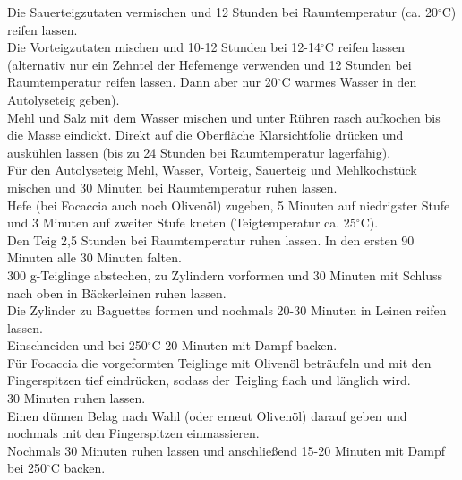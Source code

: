 Die Sauerteigzutaten vermischen und 12 Stunden bei Raumtemperatur (ca. 20$^\circ$C) reifen lassen.\\
Die Vorteigzutaten mischen und 10-12 Stunden bei 12-14$^\circ$C reifen lassen (alternativ nur ein Zehntel der Hefemenge verwenden und 12 Stunden bei Raumtemperatur reifen lassen. Dann aber nur 20$^\circ$C warmes Wasser in den Autolyseteig geben).\\
Mehl und Salz mit dem Wasser mischen und unter Rühren rasch aufkochen bis die Masse eindickt. Direkt auf die Oberfläche Klarsichtfolie drücken und auskühlen lassen (bis zu 24 Stunden bei Raumtemperatur lagerfähig).\\
Für den Autolyseteig Mehl, Wasser, Vorteig, Sauerteig und Mehlkochstück mischen und 30 Minuten bei Raumtemperatur ruhen lassen.\\
Hefe (bei Focaccia auch noch Olivenöl) zugeben, 5 Minuten auf niedrigster Stufe und 3 Minuten auf zweiter Stufe kneten (Teigtemperatur ca. 25$^\circ$C).\\
Den Teig 2,5 Stunden bei Raumtemperatur ruhen lassen. In den ersten 90 Minuten alle 30 Minuten falten.\\
300 g-Teiglinge abstechen, zu Zylindern vorformen und 30 Minuten mit Schluss nach oben in Bäckerleinen ruhen lassen.\\
Die Zylinder zu Baguettes formen und nochmals 20-30 Minuten in Leinen reifen lassen.\\
Einschneiden und bei 250$^\circ$C 20 Minuten mit Dampf backen.\\
Für Focaccia die vorgeformten Teiglinge mit Olivenöl beträufeln und mit den Fingerspitzen tief eindrücken, sodass der Teigling flach und länglich wird.\\
30 Minuten ruhen lassen.\\
Einen dünnen Belag nach Wahl (oder erneut Olivenöl) darauf geben und nochmals mit den Fingerspitzen einmassieren.\\
Nochmals 30 Minuten ruhen lassen und anschließend 15-20 Minuten mit Dampf bei 250$^\circ$C backen.\\
\newpage


